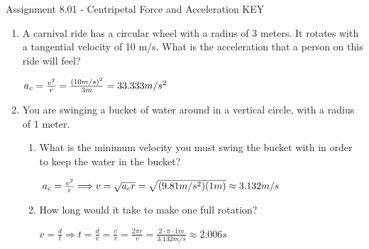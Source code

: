 \documentclass[letterpaper, 12pt]{article}
\newcommand{\assnum}{Assignment 8.01}
\newcommand{\assname}{Centripetal Force and Acceleration KEY}
\begin{document}
\fancyfoot[r]{\assnum}	


\begin{center} \assnum{} - \assname{}
\end{center}

\begin{enumerate}
	\item A carnival ride has a circular wheel with a radius of 3 meters.  It rotates with a tangential velocity of 10 m/s.  What is the acceleration that a person on this ride will feel?
		
		\color{red}
		\begin{center}
		$ a_c = \frac{v^2}{r} = \frac{(10m/s)^2}{3m} = 33.333 m/s^2
		\vspace{.15in} 			$
		\end{center}
		\color{black}
	
	\item You are swinging a bucket of water around in a vertical circle, with a radius of 1 meter.  
	\begin{enumerate}
		\item What is the minimum velocity you must swing the bucket with in order to keep the water in the bucket?
		\vspace{.25in} 	
		\color{red}
		\begin{center}
		$ a_c = \frac{v^2}{r} \Longrightarrow v = \sqrt{a_cr} = \sqrt{(9.81m/s^2)(1m)} \approx 3.132 m/s
		\vspace{.25in} 			$
		\end{center}
		\color{black}
	
	
	
		\item 	How long would it take to make one full rotation?
			\vspace{.25in} 	
			
		\color{red}
		\begin{center}
			$ v = \frac{d}{t} \Longrightarrow t = \frac{d}{v} =  \frac{c}{v} = \frac {2 \pi r} {v} = \frac {2 \cdot \pi \cdot 1 m} {3.132 m/s} \approx 2.006 s		$
		\end{center}
		\color{black}
		\vspace{.25in} 	
		

\end{enumerate}
\end{enumerate}
\end{document}
